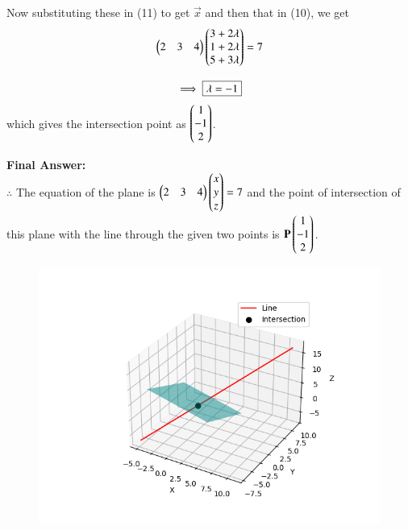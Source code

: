 \documentclass[journal,12pt,onecolumn]{IEEEtran}
\theoremstyle{remark}
\begin{document}
Now substituting these in (11) to get $\vec{x}$ and then that in (10), we get
\begin{equation}
    \begin{pmatrix}2&3&4\end{pmatrix}\begin{pmatrix}3+2\lambda \\ 1+2\lambda \\ 5+3\lambda\end{pmatrix} = 7
\end{equation}

\begin{equation}
    \implies \fbox{$\lambda = -1$}
\end{equation}
which gives the intersection point as $\begin{pmatrix}1\\-1\\2\end{pmatrix}$.

\textbf{Final Answer: }\\
$\therefore$ The equation of the plane is $\begin{pmatrix}2&3&4\end{pmatrix}\begin{pmatrix}x\\y\\z\end{pmatrix}=7$ and the point of intersection of this plane with the line through the given two points is $\mathbf{P}\begin{pmatrix}1\\-1\\2\end{pmatrix}$.

\begin{figure}[H]
    \centering
    \includegraphics[width=0.65\columnwidth]{figs/1.png}
    \caption{}
\end{figure}
\end{document}
